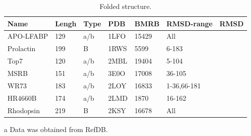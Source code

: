 \begin{table}[h]
    \caption{Folded structure.}
    \begin{center}
    \begin{threeparttable}
    \begin{tabular}{l l l l l l l}
Name                & Lengh    & Type   & PDB     & BMRB    & RMSD-range    &  RMSD  \\\hline
APO-LFABP           & 129      & a/b    & 1LFO    & 15429\tnote{a}  & All        &   \\
Prolactin           & 199      & B      & 1RWS    & 5599      & 6-183            &   \\
Top7                & 120      & a/b    & 2MBL    & 19404     & 5-104            &   \\
MSRB                & 151      & a/b    & 3E0O    & 17008     & 36-105           &   \\
WR73                & 183      & a/b    & 2LOY    & 16833     & 1-36,66-181      &   \\
HR4660B             & 174      & a/b    & 2LMD    & 1870      & 16-162           &   \\
Rhodopsin           & 219      & B      & 2KSY    & 16678     & All              &
    \end{tabular}
    \begin{tablenotes}
    \item[a] Data was obtained from RefDB.
    \end{tablenotes}
    \end{threeparttable}
    \end{center}
    \label{tab:folding_large}
\end{table}






